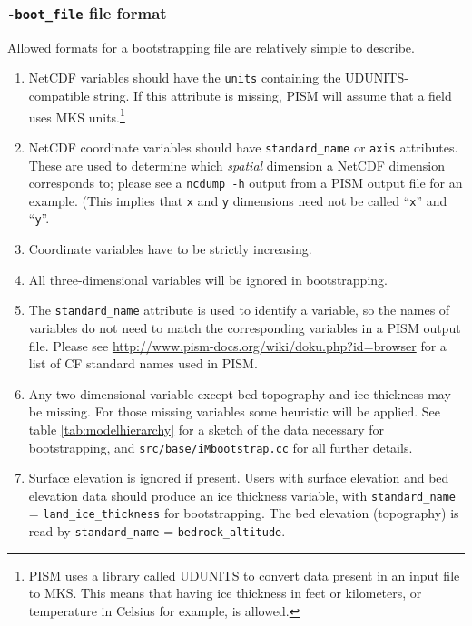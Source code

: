 \documentclass[titlepage,letterpaper,final]{scrartcl}
\newcommand{\PISMBROWSERURL}{http://www.pism-docs.org/wiki/doku.php?id=browser}
\begin{document}
\subsubsection*{\texttt{-boot_file} file format}
\label{sec:bootstrapping-format}  Allowed formats for a bootstrapping file are relatively simple to describe. 
\begin{enumerate}
\item NetCDF variables should have the \texttt{units} containing the
  UDUNITS-compatible string. If this attribute is missing, PISM will assume
  that a field uses MKS units.\footnote{PISM uses a library called UDUNITS to convert data present in an input file to MKS.   This means that having ice thickness in feet or kilometers, or temperature in Celsius for example, is allowed.}
\item NetCDF coordinate variables should have \texttt{standard_name} or
  \texttt{axis} attributes. These are used to
  determine which \emph{spatial} dimension a NetCDF dimension corresponds to;
  please see a \texttt{ncdump -h} output from a PISM output file for an example. (This implies
  that \texttt{x} and \texttt{y} dimensions need not be called ``\texttt{x}''
  and ``\texttt{y}''.
\item Coordinate variables have to be strictly increasing.
\item All three-dimensional variables will be ignored in bootstrapping.
\item The \texttt{standard_name} attribute is used to identify a variable, so
  the names of variables do not need to match the corresponding variables in a
  PISM output file. Please see \url{\PISMBROWSERURL} for a list of CF standard
  names used in PISM.
\item Any two-dimensional variable except bed topography and ice thickness may
  be missing. For those missing variables some heuristic will be applied. See
  table \ref{tab:modelhierarchy} for a sketch of the data necessary for
  bootstrapping, and \texttt{src/base/iMbootstrap.cc} for all further details.
\item Surface elevation is ignored if present. Users with surface elevation and
  bed elevation data should produce an ice thickness variable, with
  \texttt{standard_name} = \texttt{land_ice_thickness} for bootstrapping. The
  bed elevation (topography) is read by \texttt{standard_name} =
  \texttt{bedrock_altitude}.
\end{enumerate}
\end{document}
